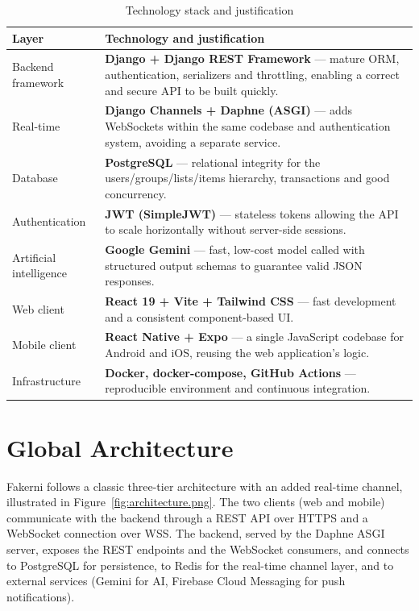 \documentclass[12pt,a4paper,oneside]{report}
\begin{document}
\begin{table}[ht]\centering
\caption{Technology stack and justification}\label{tab:tech}
\begin{tabularx}{\linewidth}{@{}lX@{}}
\toprule
\textbf{Layer} & \textbf{Technology and justification}\\
\midrule
Backend framework & \textbf{Django + Django REST Framework} --- mature ORM, authentication, serializers and throttling, enabling a correct and secure API to be built quickly.\\
Real-time & \textbf{Django Channels + Daphne (ASGI)} --- adds WebSockets within the same codebase and authentication system, avoiding a separate service.\\
Database & \textbf{PostgreSQL} --- relational integrity for the users/groups/lists/items hierarchy, transactions and good concurrency.\\
Authentication & \textbf{JWT (SimpleJWT)} --- stateless tokens allowing the API to scale horizontally without server-side sessions.\\
Artificial intelligence & \textbf{Google Gemini} --- fast, low-cost model called with structured output schemas to guarantee valid JSON responses.\\
Web client & \textbf{React 19 + Vite + Tailwind CSS} --- fast development and a consistent component-based UI.\\
Mobile client & \textbf{React Native + Expo} --- a single JavaScript codebase for Android and iOS, reusing the web application's logic.\\
Infrastructure & \textbf{Docker, docker-compose, GitHub Actions} --- reproducible environment and continuous integration.\\
\bottomrule
\end{tabularx}
\end{table}

\section{Global Architecture}
Fakerni follows a classic three-tier architecture with an added real-time
channel, illustrated in Figure~\ref{fig:architecture.png}. The two clients (web
and mobile) communicate with the backend through a REST API over HTTPS and a
WebSocket connection over WSS. The backend, served by the Daphne ASGI server,
exposes the REST endpoints and the WebSocket consumers, and connects to
PostgreSQL for persistence, to Redis for the real-time channel layer, and to
external services (Gemini for AI, Firebase Cloud Messaging for push
notifications).
\end{document}
